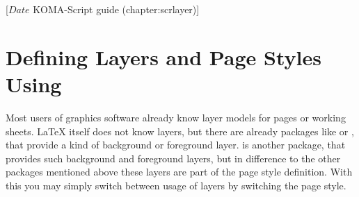 %
%
%
%
%
%
%
%
% 
%
%
%
%

                 [$Date$
                  KOMA-Script guide (chapter:scrlayer)]



\chapter[{Defining Layers and Page Styles Using \Package{scrlayer}}]%
{Defining Layers and Page Styles Using %
}

%
%
Most users of graphics software already know layer models for pages or working
sheets. \LaTeX{} itself does not know layers, but there are already packages
like  or , that provide a kind of
background or foreground layer.  is another package,
that provides such background and foreground layers, but in difference
to the other packages mentioned above these layers are part of the
page style definition. With this you may simply switch between usage
of layers by switching the page style.

